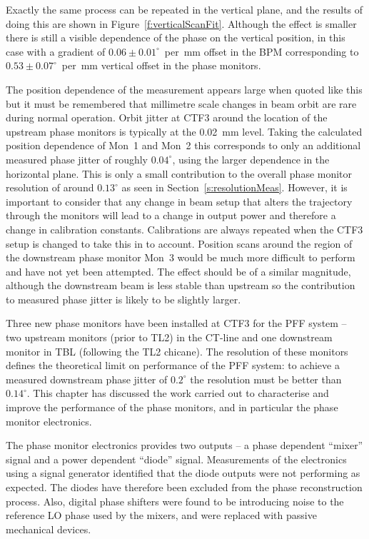 Exactly the same process can be repeated in the vertical plane, and the results of doing this are shown in Figure~\ref{f:verticalScanFit}. Although the effect is smaller there is still a visible dependence of the phase on the vertical position, in this case with a gradient of \(0.06\pm0.01^\circ\)~per~mm offset in the BPM corresponding to \(0.53\pm0.07^\circ\)~per~mm vertical offset in the phase monitors.


The position dependence of the measurement appears large when quoted like this but it must be remembered that millimetre scale changes in beam orbit are rare during normal operation. Orbit jitter at CTF3 around the location of the upstream phase monitors is typically at the 0.02~mm level. Taking the calculated position dependence of Mon~1 and Mon~2 this corresponds to only an additional measured phase jitter of roughly \(0.04^\circ\), using the larger dependence in the horizontal plane. This is only a small contribution to the overall phase monitor resolution of around \(0.13^\circ\) as seen in Section~\ref{s:resolutionMeas}. However, it is important to consider that any change in beam setup that alters the trajectory through the monitors will lead to a change in output power and therefore a change in calibration constants. Calibrations are always repeated when the CTF3 setup is changed to take this in to account. Position scans around the region of the downstream phase monitor Mon~3 would be much more difficult to perform and have not yet been attempted. The effect should be of a similar magnitude, although the downstream beam is less stable than upstream so the contribution to measured phase jitter is likely to be slightly larger. 


Three new phase monitors have been installed at CTF3 for the PFF system -- two upstream monitors (prior to TL2) in the CT-line and one downstream monitor in TBL (following the TL2 chicane). The resolution of these monitors defines the theoretical limit on performance of the PFF system: to achieve a measured downstream phase jitter of \(0.2^\circ\) the resolution must be better than \(0.14^\circ\). This chapter has discussed the work carried out to characterise and improve the performance of the phase monitors, and in particular the phase monitor electronics.

The phase monitor electronics provides two outputs -- a phase dependent ``mixer'' signal and a power dependent ``diode'' signal. Measurements of the electronics using a signal generator identified that the diode outputs were not performing as expected. The diodes have therefore been excluded from the phase reconstruction process. Also, digital phase shifters were found to be introducing noise to the reference LO phase used by the mixers, and were replaced with passive mechanical devices.

